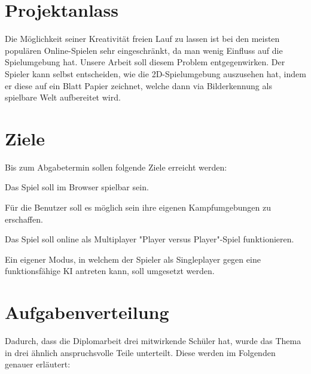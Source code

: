 \section{Projektanlass}
Die Möglichkeit seiner Kreativität freien Lauf zu lassen ist bei den meisten populären
Online-Spielen sehr eingeschränkt, da man wenig Einfluss auf die Spielumgebung hat.
Unsere Arbeit soll diesem Problem entgegenwirken. Der Spieler kann selbst entscheiden,
wie die 2D-Spielumgebung auszusehen hat, indem er diese auf ein Blatt Papier zeichnet,
welche dann via Bilderkennung als spielbare Welt aufbereitet wird.

\section{Ziele}
Bis zum Abgabetermin sollen folgende Ziele erreicht werden:
\begin{compactitem}
    \item Das Spiel soll im Browser spielbar sein.
    \item Für die Benutzer soll es möglich sein ihre eigenen Kampfumgebungen zu erschaffen.
    \item Das Spiel soll online als Multiplayer "Player versus Player"-Spiel funktionieren.
    \item Ein eigener Modus, in welchem der Spieler als Singleplayer gegen eine funktionsfähige KI antreten kann, soll umgesetzt werden.
\end{compactitem}

\section{Aufgabenverteilung}
Dadurch, dass die Diplomarbeit drei mitwirkende Schüler hat, wurde das Thema in drei ähnlich
anspruchsvolle Teile unterteilt. Diese werden im Folgenden genauer erläutert:

